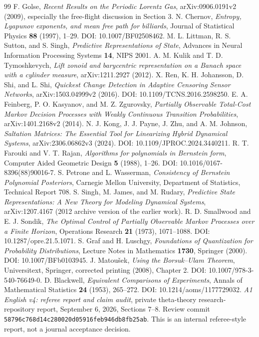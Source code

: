 \begin{thebibliography}{99}
 F. Golse, \emph{Recent Results on the Periodic Lorentz Gas},
arXiv:0906.0191v2 (2009), especially the free-flight discussion in Section 3.
 N. Chernov, \emph{Entropy, Lyapunov exponents, and mean free
path for billiards}, Journal of Statistical Physics \textbf{88} (1997),
1--29. DOI: 10.1007/BF02508462.
 M. L. Littman, R. S. Sutton, and S. Singh,
\emph{Predictive Representations of State}, Advances in Neural Information
Processing Systems \textbf{14}, NIPS 2001.
 A. M. Kulik and T. D. Tymoshkevych,
\emph{Lift zonoid and barycentric representation on a Banach space with a
cylinder measure}, arXiv:1211.2927 (2012).
 X. Ren, K. H. Johansson, D. Shi, and L. Shi,
\emph{Quickest Change Detection in Adaptive Censoring Sensor Networks},
arXiv:1503.04999v2 (2016). DOI: 10.1109/TCNS.2016.2598250.
 E. A. Feinberg, P. O. Kasyanov, and M. Z. Zgurovsky,
\emph{Partially Observable Total-Cost Markov Decision Processes with Weakly
Continuous Transition Probabilities}, arXiv:1401.2168v2 (2014).
 N. J. Kong, J. J. Payne, J. Zhu, and A. M. Johnson,
\emph{Saltation Matrices: The Essential Tool for Linearizing Hybrid Dynamical
Systems}, arXiv:2306.06862v3 (2024). DOI: 10.1109/JPROC.2024.3440211.
 R. T. Farouki and V. T. Rajan,
\emph{Algorithms for polynomials in Bernstein form}, Computer Aided Geometric
Design \textbf{5} (1988), 1--26. DOI: 10.1016/0167-8396(88)90016-7.
 S. Petrone and L. Wasserman,
\emph{Consistency of Bernstein Polynomial Posteriors}, Carnegie Mellon
University, Department of Statistics, Technical Report 708.
 S. Singh, M. James, and M. Rudary,
\emph{Predictive State Representations: A New Theory for Modeling Dynamical
Systems}, arXiv:1207.4167 (2012 archive version of the earlier work).
 R. D. Smallwood and E. J. Sondik,
\emph{The Optimal Control of Partially Observable Markov Processes over a
Finite Horizon}, Operations Research \textbf{21} (1973), 1071--1088.
DOI: 10.1287/opre.21.5.1071.
 S. Graf and H. Luschgy,
\emph{Foundations of Quantization for Probability Distributions},
Lecture Notes in Mathematics \textbf{1730}, Springer (2000).
DOI: 10.1007/BFb0103945.
 J. Matou\v sek, \emph{Using the Borsuk--Ulam Theorem},
Universitext, Springer, corrected printing (2008), Chapter 2.
DOI: 10.1007/978-3-540-76649-0.
 D. Blackwell, \emph{Equivalent Comparisons of
Experiments}, Annals of Mathematical Statistics \textbf{24} (1953),
265--272. DOI: 10.1214/aoms/1177729032.
 \emph{A1 English v4: referee report and claim audit},
private theta-theory research-repository report, September 6, 2026,
Sections 7--8. Review commit
\texttt{58796c768d14c280020d05916feb946db8fb25ab}.
This is an internal referee-style report, not a journal acceptance decision.
\end{thebibliography}
